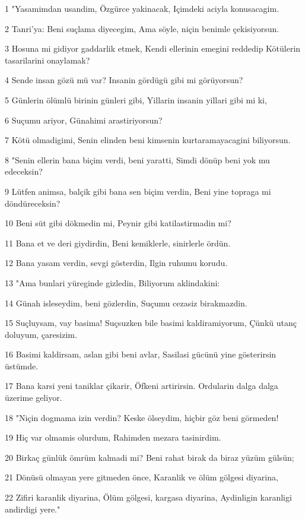 \par 1 "Yasamimdan usandim, Özgürce yakinacak, Içimdeki aciyla konusacagim.
\par 2 Tanri'ya: Beni suçlama diyecegim, Ama söyle, niçin benimle çekisiyorsun.
\par 3 Hosuna mi gidiyor gaddarlik etmek, Kendi ellerinin emegini reddedip Kötülerin tasarilarini onaylamak?
\par 4 Sende insan gözü mü var? Insanin gördügü gibi mi görüyorsun?
\par 5 Günlerin ölümlü birinin günleri gibi, Yillarin insanin yillari gibi mi ki,
\par 6 Suçumu ariyor, Günahimi arastiriyorsun?
\par 7 Kötü olmadigimi, Senin elinden beni kimsenin kurtaramayacagini biliyorsun.
\par 8 "Senin ellerin bana biçim verdi, beni yaratti, Simdi dönüp beni yok mu edeceksin?
\par 9 Lütfen animsa, balçik gibi bana sen biçim verdin, Beni yine topraga mi döndüreceksin?
\par 10 Beni süt gibi dökmedin mi, Peynir gibi katilastirmadin mi?
\par 11 Bana et ve deri giydirdin, Beni kemiklerle, sinirlerle ördün.
\par 12 Bana yasam verdin, sevgi gösterdin, Ilgin ruhumu korudu.
\par 13 "Ama bunlari yüreginde gizledin, Biliyorum aklindakini:
\par 14 Günah isleseydim, beni gözlerdin, Suçumu cezasiz birakmazdin.
\par 15 Suçluysam, vay basima! Suçsuzken bile basimi kaldiramiyorum, Çünkü utanç doluyum, çaresizim.
\par 16 Basimi kaldirsam, aslan gibi beni avlar, Sasilasi gücünü yine gösterirsin üstümde.
\par 17 Bana karsi yeni taniklar çikarir, Öfkeni artirirsin. Ordularin dalga dalga üzerime geliyor.
\par 18 "Niçin dogmama izin verdin? Keske ölseydim, hiçbir göz beni görmeden!
\par 19 Hiç var olmamis olurdum, Rahimden mezara tasinirdim.
\par 20 Birkaç günlük ömrüm kalmadi mi? Beni rahat birak da biraz yüzüm gülsün;
\par 21 Dönüsü olmayan yere gitmeden önce, Karanlik ve ölüm gölgesi diyarina,
\par 22 Zifiri karanlik diyarina, Ölüm gölgesi, kargasa diyarina, Aydinligin karanligi andirdigi yere."

